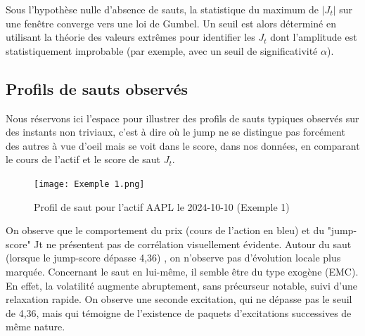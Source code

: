 \documentclass[10pt,a4paper]{article}
\theoremstyle{definition}
\theoremstyle{remark}
\begin{document}
\begin{itemize}
    Sous l'hypothèse nulle d'absence de sauts, la statistique du maximum de $|J_t|$ sur une fenêtre converge vers une loi de Gumbel. Un seuil est alors déterminé en utilisant la théorie des valeurs extrêmes pour identifier les $J_t$ dont l'amplitude est statistiquement improbable (par exemple, avec un seuil de significativité $\alpha$).


    \subsection{Profils de sauts observés}

    Nous réservons ici l'espace pour illustrer des profils de sauts typiques observés sur des instants non triviaux, c'est à dire où le jump ne se distingue pas forcément des autres à vue d'oeil mais se voit dans le score, dans nos données, en comparant le cours de l'actif et le score de saut $J_t$.

    \begin{figure}[H]
        \centering
        \texttt{[image: Exemple 1.png]}
        \caption{Profil de saut pour l'actif AAPL le 2024-10-10 (Exemple 1)}
        \label{fig:jump_example_1}
    \end{figure}
    
    On observe que le comportement du prix (cours de l'action en bleu) et du "jump-score" Jt ne présentent pas de corrélation visuellement évidente. Autour du saut (lorsque le jump-score dépasse 4,36) , on n'observe pas d'évolution locale plus marquée. Concernant le saut en lui-même, il semble être du type exogène (EMC). En effet, la volatilité augmente abruptement, sans précurseur notable, suivi d'une relaxation rapide. On observe une seconde excitation, qui ne dépasse pas le seuil de 4,36, mais qui témoigne de l'existence de paquets d'excitations successives de même nature. 


\end{itemize}
\end{document}
